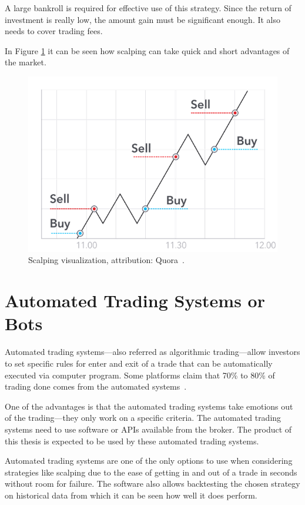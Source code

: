 A large bankroll is required for effective use of this strategy. Since the return of investment is really low, the amount gain must be significant enough. It also needs to cover trading fees.

In Figure \ref{scalping-figure} it can be seen how scalping can take quick and short advantages of the market.

\begin{figure}[!hbt]
    \centering
    \includegraphics[width=\columnwidth]{figures/scalping.png}
    \caption{Scalping visualization, attribution: Quora~\cite{best-crypto-daytrading}.}
    \label{scalping-figure}
\end{figure}

\section{Automated Trading Systems or Bots}
\label{bots}
Automated trading systems---also referred as algorithmic trading---allow investors to set specific rules for enter and exit of a trade that can be automatically executed via computer program. Some platforms claim that 70\% to 80\% of trading done comes from the automated systems~\cite{investopedia-bot-trading}.

One of the advantages is that the automated trading systems take emotions out of the trading---they only work on a specific criteria. The automated trading systems need to use software or APIs available from the broker. The product of this thesis is expected to be used by these automated trading systems.

Automated trading systems are one of the only options to use when considering strategies like scalping due to the ease of getting in and out of a trade in seconds without room for failure. The software also allows backtesting the chosen strategy on historical data from which it can be seen how well it does perform.

